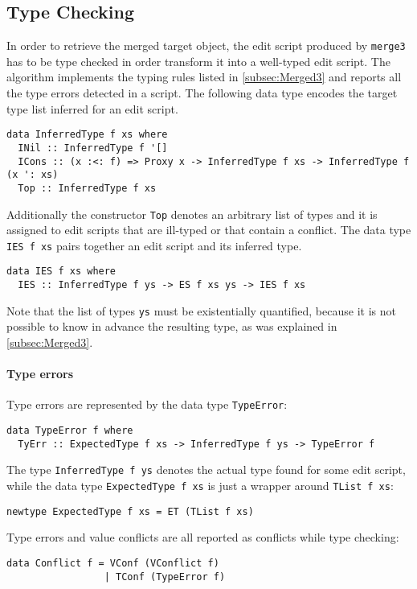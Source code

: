 \documentclass[../Thesis.tex]{subfiles}
\begin{document}
	\subsection{Type Checking}
	\label{subsec:TyCheck}
	In order to retrieve the merged target object, the edit script 
	produced by \texttt{merge3} has to be type checked in order transform it 
	into a well-typed edit script.
	The algorithm implements the typing rules listed in \ref{subsec:Merged3}
	and reports all the type errors detected in a script.
	The following data type encodes the target type list 
	inferred for an edit script.
	
\begin{verbatim}
data InferredType f xs where
  INil :: InferredType f '[]
  ICons :: (x :<: f) => Proxy x -> InferredType f xs -> InferredType f (x ': xs)
  Top :: InferredType f xs
\end{verbatim}	
	Additionally the constructor \texttt{Top} denotes an arbitrary list of types
	and it is assigned to edit scripts that are ill-typed or that contain a conflict.
	The data type \texttt{IES f xs} pairs together an edit script and its inferred 
	type.
\begin{verbatim}
data IES f xs where
  IES :: InferredType f ys -> ES f xs ys -> IES f xs
\end{verbatim}
	 Note that the list of types \texttt{ys} must be existentially quantified,
	 because it is not possible to know in advance the resulting type, as was 
	 explained in \ref{subsec:Merged3}.
	
	\paragraph{Type errors}
	Type errors are represented by the data type \texttt{TypeError}:
\begin{verbatim}
data TypeError f where
  TyErr :: ExpectedType f xs -> InferredType f ys -> TypeError f
\end{verbatim}
	
	The type \texttt{InferredType f ys} denotes the actual type found for
	some edit script, while the data type \texttt{ExpectedType f xs} is just a 
	wrapper around \texttt{TList f xs}:
\begin{verbatim}
newtype ExpectedType f xs = ET (TList f xs)
\end{verbatim}

	Type errors and value conflicts are all reported as conflicts while type 
	checking:
\begin{verbatim}
data Conflict f = VConf (VConflict f)
                 | TConf (TypeError f)
\end{verbatim}
	
\end{document}
